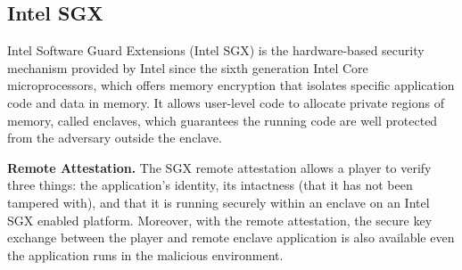 \subsection{Intel SGX}
Intel Software Guard Extensions (Intel SGX) is the hardware-based security  mechanism provided by Intel since the sixth generation Intel Core microprocessors, which offers memory encryption that isolates specific application code and data in memory.
It allows user-level code to allocate private regions of memory, called enclaves, which guarantees the running code are well protected from the adversary outside the enclave.
 
\noindent\textbf{Remote Attestation.} The SGX remote attestation allows a player to verify three things: the application's identity, its intactness (that it has not been tampered with), and that it is running securely within an enclave on an Intel SGX enabled platform. Moreover, with the remote attestation, the secure key exchange between the player and remote enclave application is also available even the application runs in the malicious environment.